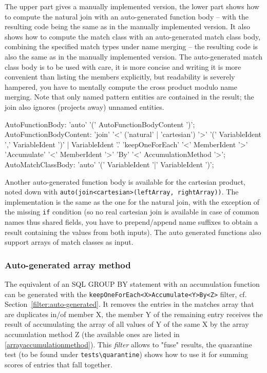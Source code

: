 The upper part gives a manually implemented version, the lower part shows how to compute the natural join with an auto-generated function body -- with the resulting code being the same as in the manually implemented version.
It also shows how to compute the match class with an auto-generated match class body, combining the specified match types under name merging -- the resulting code is also the same as in the manually implemented version.
The auto-generated match class body is to be used with care, it is more concise and writing it is more convenient than listing the members explicitly, but readability is severely hampered, you have to mentally compute the cross product modulo name merging.
Note that only named pattern entities are contained in the result; the join also ignores (projects away) unnamed entities.

\begin{rail}
  AutoFunctionBody: 'auto' '(' AutoFunctionBodyContent ')';
  AutoFunctionBodyContent: 'join' '<' ('natural' | 'cartesian') '>' '(' VariableIdent ',' VariableIdent ')' | VariableIdent '.' 'keepOneForEach' '<' MemberIdent '>' \\ 'Accumulate' '<' MemberIdent '>' 'By' '<' AccumulationMethod '>';
  AutoMatchClassBody: 'auto' '(' VariableIdent '|' VariableIdent ')';
\end{rail}

Another auto-generated function body is available for the cartesian product, noted down with \texttt{auto(join<cartesian>(leftArray, rightArray))}.
The implementation is the same as the one for the natural join, with the exception of the missing \texttt{if} condition (so no real cartesian join is available in case of common names thus shared fields, you have to prepend/append name suffixes to obtain a result containing the values from both inputs).
The auto generated functions also support arrays of match classes as input.

\subsubsection*{Auto-generated array method}

The equivalent of an SQL GROUP BY statement with an accumulation function can be generated with the \texttt{keepOneForEach<X>Accumulate<Y>By<Z>} filter, cf. Section~\ref{filter:auto-generated}.
It removes the entries in the matches array that are duplicates in/of member X, the member Y of the remaining entry receives the result of accumulating the array of all values of Y of the same X by the array accumulation method Z (the available ones are listed in \ref{arrayaccumulationmethod}).
This \emph{filter} allows to "fuse" results, the quarantine test (to be found under \verb#tests\quarantine#) shows how to use it for summing scores of entries that fall together.

